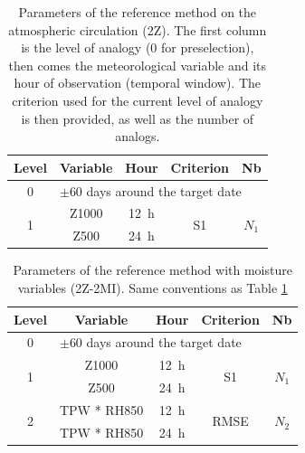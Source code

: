 \documentclass[hess, manuscript]{copernicus}
\begin{document}
\clearpage


\begin{table}[htb]
	\caption{Parameters of the reference method on the atmospheric circulation (2Z). The first column is the level of analogy (0 for preselection), then comes the meteorological variable and its hour of observation (temporal window). The criterion used for the current level of analogy is then provided, as well as the number of analogs.}
	\footnotesize
	\begin{center}
		\begin{tabular}{ccccc}
			\hline
			Level & Variable & Hour & Criterion & Nb \\ 
			\hline 
			0 & \multicolumn{4}{l}{$\pm 60$ days around the target date} \\
			\hline 
			\multirow{2}{*}{1} & Z1000 & 12~h & \multirow{2}{*}{S1} & \multirow{2}{*}{$N_{1}$} \\
			& Z500 & 24~h & & \\ 
			\hline 
		\end{tabular} 
	\end{center}
	\label{table:method_2Z}
\end{table}

\begin{table}[htb]
	\caption{Parameters of the reference method with moisture variables (2Z-2MI). Same conventions as Table \ref{table:method_2Z}}
	\footnotesize
	\begin{center}
		\begin{tabular}{ccccc}
			\hline 
			Level & Variable & Hour & Criterion & Nb \\ 
			\hline 
			0 & \multicolumn{4}{l}{$\pm 60$ days around the target date} \\
			\hline 
			\multirow{2}{*}{1} & Z1000 & 12~h & \multirow{2}{*}{S1} & \multirow{2}{*}{$N_{1}$} \\
			& Z500 & 24~h & & \\ 
			\hline
			\multirow{2}{*}{2} & TPW * RH850 & 12~h & \multirow{2}{*}{RMSE} & \multirow{2}{*}{$N_{2}$} \\
			& TPW * RH850 & 24~h & & \\ 
			\hline 
		\end{tabular} 
	\end{center}
	\label{table:method_2Z-2MI}
\end{table}
\end{document}
